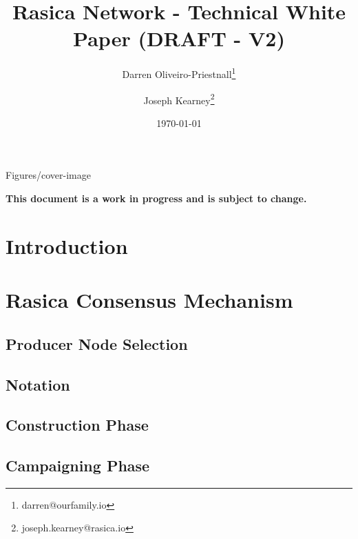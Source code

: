 \documentclass{article}
\title{\textbf{Rasica Network - Technical White Paper (DRAFT - V2)}}
\date{\today}
\author[1]{Darren Oliveiro-Priestnall\thanks{darren@ourfamily.io}}
\author[2]{Joseph Kearney\thanks{joseph.kearney@rasica.io}}
\affil[1]{Rasica Foundation}
\begin{document}
 {Figures/cover-image}

\maketitle

\abstract



\begin{center}
\vspace{50mm}
\textbf{This document is a work in progress and is subject to change.}
\end{center}

\newpage

{
  \hypersetup{linkcolor=black}
  \tableofcontents
}
\newpage


\section*{Introduction}



\newpage
\section{Rasica Consensus Mechanism}



\subsection{Producer Node Selection}




\subsection{Notation} 



\subsection{Construction Phase}




\subsection{Campaigning Phase}
\end{document}
